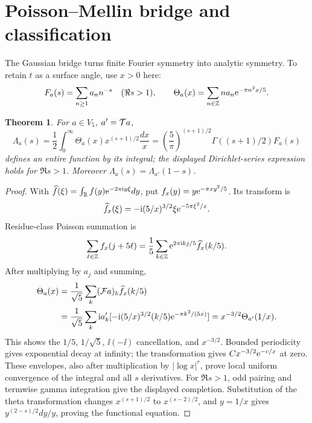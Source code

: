 \documentclass[11pt]{article}
\newtheorem{theorem}{Theorem}[section]\newtheorem{proposition}[theorem]{Proposition}\newtheorem{corollary}[theorem]{Corollary}
\begin{document}
\section{Poisson--Mellin bridge and classification}\label{sec:theta}
The Gaussian bridge turns finite Fourier symmetry into analytic symmetry.
To retain $t$ as a surface angle, use $x>0$ here:
\[
F_a(s)=\sum_{n\ge1}a_n n^{-s}\quad(\Re s>1),\qquad
\Theta_a(x)=\sum_{n\in\mathbb Z}na_n\mathrm e^{-\pi n^2x/5}.
\]
\begin{theorem}\label{poisson}
For $a\in V_5$, $a'=\mathcal T a$,
\[
\Lambda_a(s)=\frac{1}{2}\int_0^\infty\Theta_a(x)x^{(s+1)/2}\frac{dx}{x}
=\left(\frac{5}{\pi}\right)^{(s+1)/2}\Gamma((s+1)/2)F_a(s)
\]
defines an entire function by its integral; the displayed Dirichlet-series
expression holds for $\Re s>1$.  Moreover $\Lambda_a(s)=\Lambda_{a'}(1-s)$.
\end{theorem}
\begin{proof}
With $\widehat f(\xi)=\int_\mathbb R f(y)\mathrm e^{-2\pi\mathrm i y\xi}dy$,
put $f_x(y)=y\mathrm e^{-\pi xy^2/5}$.  Its transform is
\[\widehat f_x(\xi)=-\mathrm i(5/x)^{3/2}\xi\mathrm e^{-5\pi\xi^2/x}.\]
Residue-class Poisson summation \cite[\S1.8(iv)]{DLMF} is
\[
\sum_{\ell\in\mathbb Z}f_x(j+5\ell)=\frac{1}{5}\sum_{k\in\mathbb Z}
\mathrm e^{2\pi\mathrm i kj/5}\widehat f_x(k/5).
\]
After multiplying by $a_j$ and summing,
\begin{align*}
\Theta_a(x)&=\frac{1}{\sqrt5}\sum_k(\mathcal F a)_k\widehat f_x(k/5)\\
&=\frac{1}{\sqrt5}\sum_k\mathrm i a'_k[-\mathrm i(5/x)^{3/2}(k/5)
\mathrm e^{-\pi k^2/(5x)}]=x^{-3/2}\Theta_{a'}(1/x).
\end{align*}
This shows the $1/5$, $1/\sqrt5$, $\ii(-\ii)$ cancellation, and
$x^{-3/2}$.  Bounded periodicity gives exponential decay at infinity;
the transformation gives $Cx^{-3/2}\mathrm e^{-c/x}$ at zero.  These envelopes,
also after multiplication by $|\log x|^r$, prove local uniform convergence
of the integral and all $s$ derivatives.  For $\Re s>1$, odd pairing and
termwise gamma integration give the displayed completion.  Substitution of
the theta transformation changes $x^{(s+1)/2}$ to $x^{(s-2)/2}$, and
$y=1/x$ gives $y^{(2-s)/2}dy/y$, proving the functional equation.
\end{proof}
\end{document}

